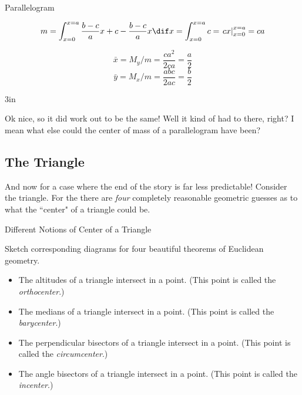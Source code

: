 \begin{exercise}{Parallelogram \Coffeecup \Coffeecup}
\begin{itemize}
{\begin{align*}
m=\int_{x=0}^{x=a}\frac{b-c}{a}x+c-\frac{b-c}{a}x\dif x=\int_{x=0}^{x=a} c=\left.cx\right|_{x=0}^{x=a}=ca
\end{align*}

$$\bar{x}=M_y/m = \frac{ca^2}{2ca}=\frac{a}{2}$$
$$\bar{y}=M_x/m = \frac{abc}{2ac}=\frac{b}{2}$$}{3in}
\end{itemize}

\end{exercise}
Ok nice, so it did work out to be the same!  Well it kind of had to there, right?  I mean what else could the center of mass of a parallelogram have been?

\subsection{The Triangle}

And now for a case where the end of the story is far less predictable!  Consider the triangle.  For the  there are \emph{four} completely reasonable geometric guesses as to what the ``center" of a triangle could be.  

\begin{exercise}{Different Notions of Center of a Triangle \Coffeecup}

Sketch corresponding diagrams for four beautiful theorems of Euclidean geometry.

\begin{itemize}

\item The altitudes of a triangle intersect in a point.  (This point is called the \emph{orthocenter}.)

\vspace*{2in}

\item The medians of a triangle intersect in a point.  (This point is called the \emph{barycenter}.)

\vspace*{2in}

\item The perpendicular bisectors of a triangle intersect in a point.  (This point is called the \emph{circumcenter}.)

\vspace*{2in}

\item The angle bisectors of a triangle intersect in a point.  (This point is called the \emph{incenter}.)

\vspace*{2in}

\end{itemize}
\end{exercise}

